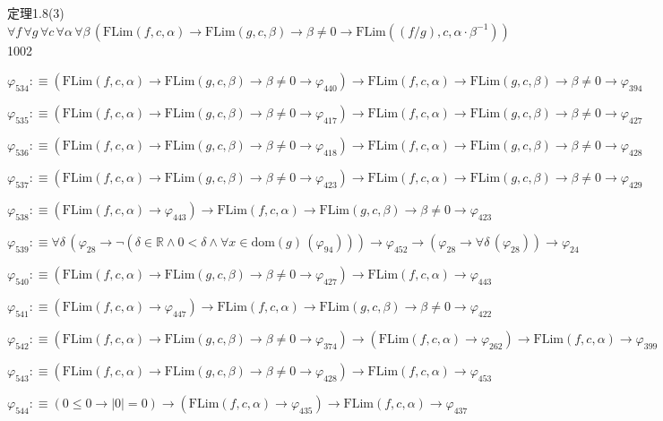 \begin{fullproof}{定理1.8(3)}{$\forall f\,\forall g\,\forall c\,\forall \alpha\,\forall \beta\,(\mathrm{FLim}(f,c,\alpha) \to \mathrm{FLim}(g,c,\beta) \to \beta \neq 0 \to \mathrm{FLim}((f / g),c,\alpha \cdot \beta^{-1}))$}{1002}
\begin{abbrevlist}
\item $\varphi_{534} :\equiv (\mathrm{FLim}(f,c,\alpha) \to \mathrm{FLim}(g,c,\beta) \to \beta \neq 0 \to \varphi_{440}) \to \mathrm{FLim}(f,c,\alpha) \to \mathrm{FLim}(g,c,\beta) \to \beta \neq 0 \to \varphi_{394}$
\item $\varphi_{535} :\equiv (\mathrm{FLim}(f,c,\alpha) \to \mathrm{FLim}(g,c,\beta) \to \beta \neq 0 \to \varphi_{417}) \to \mathrm{FLim}(f,c,\alpha) \to \mathrm{FLim}(g,c,\beta) \to \beta \neq 0 \to \varphi_{427}$
\item $\varphi_{536} :\equiv (\mathrm{FLim}(f,c,\alpha) \to \mathrm{FLim}(g,c,\beta) \to \beta \neq 0 \to \varphi_{418}) \to \mathrm{FLim}(f,c,\alpha) \to \mathrm{FLim}(g,c,\beta) \to \beta \neq 0 \to \varphi_{428}$
\item $\varphi_{537} :\equiv (\mathrm{FLim}(f,c,\alpha) \to \mathrm{FLim}(g,c,\beta) \to \beta \neq 0 \to \varphi_{423}) \to \mathrm{FLim}(f,c,\alpha) \to \mathrm{FLim}(g,c,\beta) \to \beta \neq 0 \to \varphi_{429}$
\item $\varphi_{538} :\equiv (\mathrm{FLim}(f,c,\alpha) \to \varphi_{443}) \to \mathrm{FLim}(f,c,\alpha) \to \mathrm{FLim}(g,c,\beta) \to \beta \neq 0 \to \varphi_{423}$
\item $\varphi_{539} :\equiv \forall \delta\,(\varphi_{28} \to \neg (\delta \in \mathbb{R} \land 0 < \delta \land \forall x \in \mathrm{dom}(g)\,(\varphi_{94}))) \to \varphi_{452} \to (\varphi_{28} \to \forall \delta\,(\varphi_{28})) \to \varphi_{24}$
\item $\varphi_{540} :\equiv (\mathrm{FLim}(f,c,\alpha) \to \mathrm{FLim}(g,c,\beta) \to \beta \neq 0 \to \varphi_{427}) \to \mathrm{FLim}(f,c,\alpha) \to \varphi_{443}$
\item $\varphi_{541} :\equiv (\mathrm{FLim}(f,c,\alpha) \to \varphi_{447}) \to \mathrm{FLim}(f,c,\alpha) \to \mathrm{FLim}(g,c,\beta) \to \beta \neq 0 \to \varphi_{422}$
\item $\varphi_{542} :\equiv (\mathrm{FLim}(f,c,\alpha) \to \mathrm{FLim}(g,c,\beta) \to \beta \neq 0 \to \varphi_{374}) \to (\mathrm{FLim}(f,c,\alpha) \to \varphi_{262}) \to \mathrm{FLim}(f,c,\alpha) \to \varphi_{399}$
\item $\varphi_{543} :\equiv (\mathrm{FLim}(f,c,\alpha) \to \mathrm{FLim}(g,c,\beta) \to \beta \neq 0 \to \varphi_{428}) \to \mathrm{FLim}(f,c,\alpha) \to \varphi_{453}$
\item $\varphi_{544} :\equiv (0 \leq 0 \to \lvert 0 \rvert = 0) \to (\mathrm{FLim}(f,c,\alpha) \to \varphi_{435}) \to \mathrm{FLim}(f,c,\alpha) \to \varphi_{437}$

\end{abbrevlist}
\end{fullproof}

